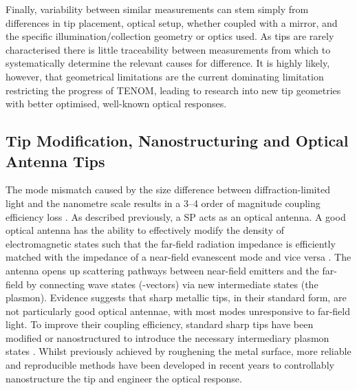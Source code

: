 \documentclass{article}
\begin{document}
Finally, variability between similar measurements can stem simply from differences in tip placement, optical setup, whether coupled with a mirror, and the specific illumination/collection geometry or optics used. As tips are rarely characterised there is little traceability between measurements from which to systematically determine the relevant causes for difference. It is highly likely, however, that geometrical limitations are the current dominating limitation restricting the progress of TENOM, leading to research into new tip geometries with better optimised, well-known optical responses.

\subsection{Tip Modification, Nanostructuring and Optical Antenna Tips}

The mode mismatch caused by the size difference between diffraction-limited light and the nanometre scale results in a 3--4 order of magnitude coupling efficiency loss \cite{berweger2010}. As described previously, a SP acts as an optical antenna. A good optical antenna has the ability to effectively modify the density of electromagnetic states such that the far-field radiation impedance is efficiently matched with the impedance of a near-field evanescent mode and vice versa \cite{novotny2006, novotny2011}. The antenna opens up scattering pathways between near-field emitters and the far-field by connecting wave states (\wvm-vectors) via new intermediate states (the plasmon). Evidence suggests that sharp metallic tips, in their standard form, are not particularly good optical antennae, with most modes unresponsive to far-field light. To improve their coupling efficiency, standard sharp tips have been modified or nanostructured to introduce the necessary intermediary plasmon states \cite{mauser2014}. Whilst previously achieved by roughening the metal surface, more reliable and reproducible methods have been developed in recent years to controllably nanostructure the tip and engineer the optical response.
\end{document}
